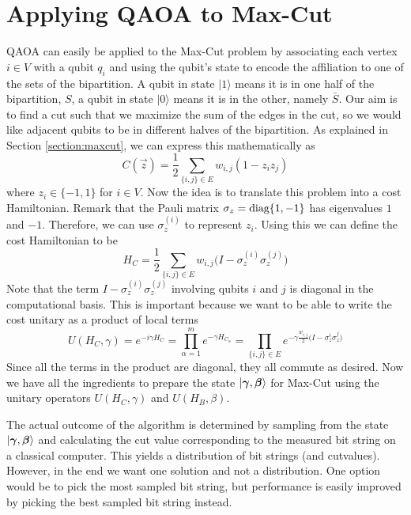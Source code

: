\section{Applying QAOA to Max-Cut}
\label{sec:maxcut-qaoa}
QAOA can easily be applied to the Max-Cut problem by associating each vertex $i \in V$ with a qubit $q_i$ and using the qubit's state to encode the affiliation to one of the sets of the bipartition. A qubit in state $|1\rangle$ means it is in one half of the bipartition, $S$, a qubit in state $|0\rangle$ means it is in the other, namely $\bar{S}$. Our aim is to find a cut such that we maximize the sum of the edges in the cut, so we would like adjacent qubits to be in different halves of the bipartition. As explained in Section \ref{section:maxcut}, we can express this mathematically as
\begin{equation}
	C(\vec{z}) = \frac{1}{2}\sum_{\{i,j\}\in E} w_{i,j}(1-z_i z_j)
\end{equation}
where $z_i \in \{-1,1\}$ for $i\in V$. Now the idea is to translate this problem into a cost Hamiltonian. Remark that the Pauli matrix $\sigma_z = \text{diag}\{1,-1\}$ has eigenvalues $1$ and $-1$. Therefore, we can use $\sigma_z^{(i)}$ to represent $z_i$. Using this we can define the cost Hamiltonian to be
\begin{equation}
	H_C = \frac{1}{2} \sum_{\{i,j\}\in E} w_{i,j}\big(I-\sigma_z^{(i)}\sigma_z^{(j)}\big)
\end{equation}
Note that the term $I-\sigma_z^{(i)}\sigma_z^{(j)}$ involving qubits $i$ and $j$ is diagonal in the computational basis. This is important because we want to be able to write the cost unitary as a product of local terms
\begin{equation}
	U(H_C, \gamma) = e^{-i\gamma H_C} = \prod_{\alpha=1}^m e^{-\gamma H_{C_\alpha}} = \prod_{\{i,j\}\in E} e^{-\gamma \frac{w_{i,j}}{2}\big(I-\sigma_z^{i}\sigma_z^{j}\big)}
\end{equation}
Since all the terms in the product are diagonal, they all commute as desired. Now we have all the ingredients to prepare the state $|\bm{\gamma},\bm{\beta}\rangle$ for Max-Cut using the unitary operators $U(H_C, \gamma)$ and $U(H_B, \beta)$. 

The actual outcome of the algorithm is determined by sampling from the state $|\bm{\gamma},\bm{\beta}\rangle$ and calculating the cut value corresponding to the measured bit string on a classical computer. This yields a distribution of bit strings (and cutvalues). However, in the end we want one solution and not a distribution. One option would be to pick the most sampled bit string, but performance is easily improved by picking the best sampled bit string instead.

